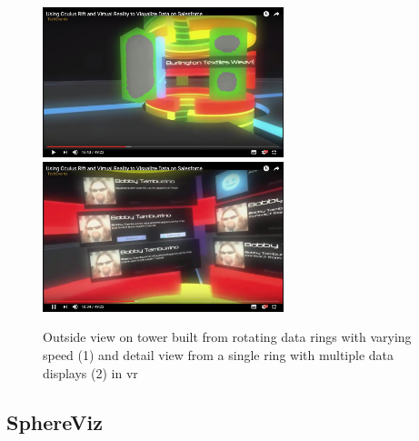 \begin{figure}[h]
	\begin{center}
		\includegraphics[width=7cm]{03_Figures/05_LitReview/CodeScience2015b.png}
		\includegraphics[width=7cm]{03_Figures/05_LitReview/CodeScience2015a.png}
		\caption[Outside view on tower built from rotating data rings with varying speed and detail view from a single ring with multiple data displays in \gls{vr}]{Outside view on tower built from rotating data rings with varying speed (1) and detail view from a single ring with multiple data displays (2) in \gls{vr} \citep{CodeScience2015}}
		\label{fig:rotatingringstoweranddetail}
	\end{center}
\end{figure}




\subsection{SphereViz}

